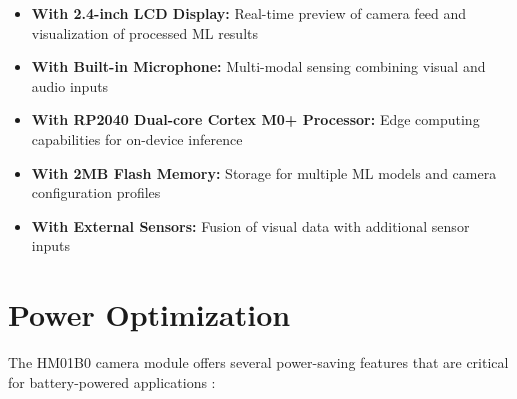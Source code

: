 \begin{itemize}
    
    
    
    \item \textbf{With 2.4-inch LCD Display:} Real-time preview of camera feed and visualization of processed ML results \cite{Arducam:2023}
    
    
    
    \item \textbf{With Built-in Microphone:} Multi-modal sensing combining visual and audio inputs
    
    
    
    \item \textbf{With RP2040 Dual-core Cortex M0+ Processor:} Edge computing capabilities for on-device inference
    
    
    
    \item \textbf{With 2MB Flash Memory:} Storage for multiple ML models and camera configuration profiles
    
    
    
    \item \textbf{With External Sensors:} Fusion of visual data with additional sensor inputs
    
    
    
\end{itemize}







\section{Power Optimization}



The HM01B0 camera module offers several power-saving features that are critical for battery-powered applications \cite{Himax:2019}:



